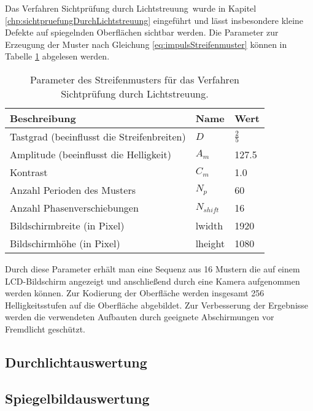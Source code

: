 Das Verfahren \glqq Sichtprüfung durch Lichtstreuung\grqq ~wurde in Kapitel \ref{chp:sichtpruefungDurchLichtstreuung} eingeführt und lässt insbesondere kleine Defekte auf spiegelnden Oberflächen sichtbar werden.
Die Parameter zur Erzeugung der Muster nach Gleichung \ref{eq:impulsStreifenmuster} können in Tabelle \ref{tab:paramSichtpruefung} abgelesen werden.

\begin{table}[H]
	\centering
	\begin{tabular}{lll}
		\hline 
		\textbf{Beschreibung} & \textbf{Name} & \textbf{Wert} \\ 
		\hline 
		Tastgrad (beeinflusst die Streifenbreiten) & $D$ & $\tfrac{2}{5}$ \\ 
		Amplitude (beeinflusst die Helligkeit) & $A_m$ & 127.5 \\ 
		Kontrast & $C_m$ & 1.0 \\ 
		Anzahl Perioden des Musters & $N_p$ & 60 \\
		Anzahl Phasenverschiebungen & $N_{shift}$ & 16 \\ 
		Bildschirmbreite (in Pixel) & \acrshort{lwidth} & 1920 \\
		Bildschirmhöhe (in Pixel) & \acrshort{lheight} & 1080 \\ 
		\hline 
	\end{tabular}
	\caption{Parameter des Streifenmusters für das Verfahren \glqq Sichtprüfung durch Lichtstreuung\grqq.}
	\label{tab:paramSichtpruefung}
\end{table}

\noindent
Durch diese Parameter erhält man eine Sequenz aus 16 Mustern die auf einem LCD-Bildschirm angezeigt und anschließend durch eine Kamera aufgenommen werden können.
Zur Kodierung der Oberfläche werden insgesamt 256 Helligkeitsstufen auf die Oberfläche abgebildet.
Zur Verbesserung der Ergebnisse werden die verwendeten Aufbauten durch geeignete Abschirmungen vor Fremdlicht geschützt.

{
	\FloatBarrier
    \subsection{Durchlichtauswertung}
    \label{sub:durchlichtAuswertungLichtstreuung}
    
}

{
	\FloatBarrier
    \subsection{Spiegelbildauswertung}
    \label{sub:spiegelbildAuswertungLichtstreuung}
    
}
